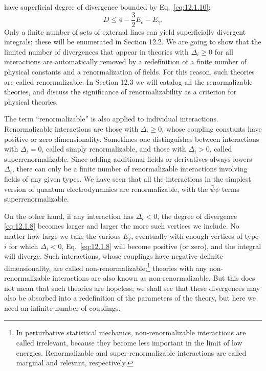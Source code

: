 

have superficial degree of divergence bounded by Eq.~\eqref{eq:12.1.10}:
\begin{equation}
  D\leq4-\frac32E_e-E_\gamma.
  \tag{12.1.11}\label{eq:12.1.11}
\end{equation}
Only a finite number of sets of external lines can yield superficially
divergent integrals; these will be enumerated in Section 12.2. We are going to
show that the limited number of divergences that appear in theories with
$\Delta_i\geq0$ for all interactions are automatically removed by a
redefinition of a finite number of physical constants and a renormalization of
fields. For this reason, such theories are called renormalizable. In Section
12.3 we will catalog all the renormalizable theories, and discuss the
significance of renormalizability as a criterion for physical theories.

The term ``renormalizable'' is also applied to individual interactions.
Renormalizable interactions are those with $\Delta_i\geq0$, whose coupling
constants have positive or zero dimensionality. Sometimes one distinguishes
between interactions with $\Delta_i=0$, called simply renormalizable, and
those with $\Delta_i>0$, called superrenormalizable. Since adding additional
fields or derivatives always lowers $\Delta_i$, there can only be a finite
number of renormalizable interactions involving fields of any given types. We
have seen that all the interactions in the simplest version of quantum
electrodynamics are renormalizable, with the $\bar\psi\psi$ terms
superrenormalizable.

On the other hand, if any interaction has $\Delta_i<0$, the degree of
divergence \eqref{eq:12.1.8} becomes larger and larger the more such vertices
we include. No matter how large we take the various $E_f$, eventually with
enough vertices of type $i$ for which $\Delta_i<0$, Eq.~\eqref{eq:12.1.8} will
become positive (or zero), and the integral will diverge. Such interactions,
whose couplings have negative-definite dimensionality, are called
non-renormalizable;\footnote{In perturbative statistical mechanics,
non-renormalizable interactions are called irrelevant, because they become
less important in the limit of low energies. Renormalizable and
super-renormalizable interactions are called marginal and relevant,
respectively.} theories with any non-renormalizable interactions are also
known as non-renormalizable. But this does not mean that such theories are
hopeless; we shall see that these divergences may also be absorbed into a
redefinition of the parameters of the theory, but here we need an infinite
number of couplings.

